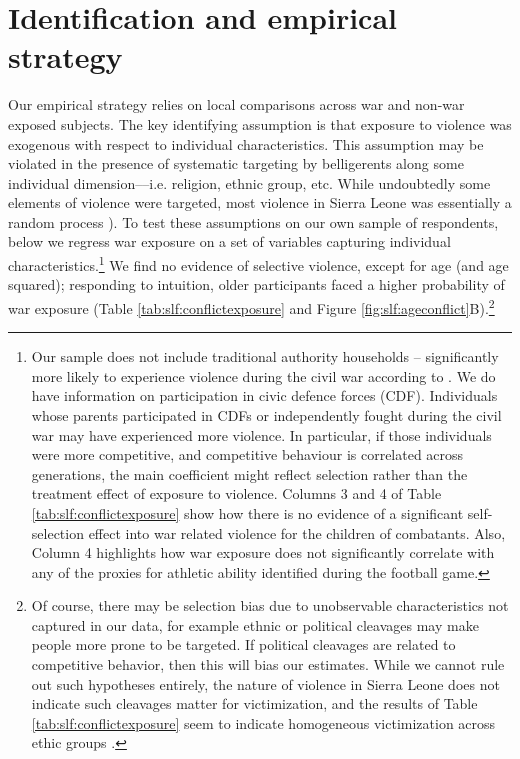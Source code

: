 \section{Identification and empirical strategy}
\label{sec:slf:identification}
Our empirical strategy relies on local comparisons across war and non-war exposed subjects. The key identifying assumption is that exposure to violence was exogenous with respect to individual characteristics. This assumption may be violated in the presence of systematic targeting by belligerents along some individual dimension––i.e. religion, ethnic group, etc. While undoubtedly some elements of violence were targeted, most violence in Sierra Leone was essentially a random process \citep{Conibere2004,Humphreys2006,Bellows2009b}). To test these assumptions on our own sample of respondents, below we regress war exposure on a set of variables capturing individual characteristics.\footnote{Our sample does not include traditional authority households – significantly more likely to experience violence during the civil war according to \citet{Bellows2009b}. We do have information on participation in civic defence forces (CDF). Individuals whose parents participated in CDFs or independently fought during the civil war may have experienced more violence. In particular, if those individuals were more competitive, and competitive behaviour is correlated across generations, the main coefficient might reflect selection rather than the treatment effect of exposure to violence. Columns 3 and 4 of Table \ref{tab:slf:conflictexposure} show how there is no evidence of a significant self-selection effect into war related violence for the children of combatants. Also, Column 4 highlights how war exposure does not significantly correlate with any of the proxies for athletic ability identified during the football game.} We find no evidence of selective violence, except for age (and age squared); responding to intuition, older participants faced a higher probability of war exposure (Table \ref{tab:slf:conflictexposure} and Figure \ref{fig:slf:ageconflict}B).\footnote{Of course, there may be selection bias due to unobservable characteristics not captured in our data, for example ethnic or political cleavages may make people more prone to be targeted. If political cleavages are related to competitive behavior, then this will bias our estimates. While we cannot rule out such hypotheses entirely, the nature of violence in Sierra Leone does not indicate such cleavages matter for victimization, and the results of Table \ref{tab:slf:conflictexposure} seem to indicate homogeneous victimization across ethic groups \citep[see also][]{Bellows2009b}.}

